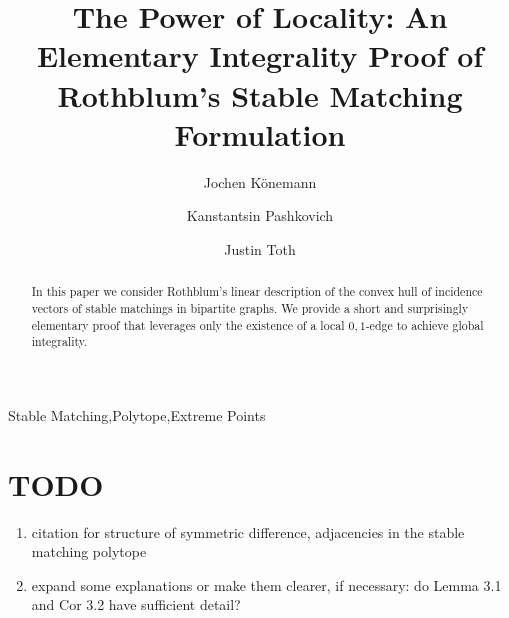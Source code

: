 \documentclass[preprint]{elsarticle}
\begin{document}
\begin{frontmatter}



\title{The Power of Locality: An Elementary Integrality
  Proof of Rothblum's Stable Matching Formulation}
\author[co]{Jochen K\"{o}nemann}
\author[co]{Kanstantsin Pashkovich}
\author[co]{Justin Toth}
\address[co]{Department of Combinatorics and Optimization, University of Waterloo, Canada}


\begin{abstract}
  In this paper we consider Rothblum's linear description of the
  convex hull of incidence vectors of stable matchings in bipartite
  graphs. We provide a short and surprisingly elementary proof that
  leverages only the existence of a local $0,1$-edge to achieve global
  integrality.
\end{abstract}
\begin{keyword}
Stable Matching\sep Polytope\sep Extreme Points
\end{keyword}
\end{frontmatter}
{\color{red}
\section*{TODO}
\begin{enumerate}
	\item citation for structure of symmetric difference, adjacencies in the stable matching polytope
	\item expand some explanations or make them clearer, if necessary: do Lemma 3.1 and Cor 3.2 have sufficient detail?
\end{enumerate}
}
\end{document}
